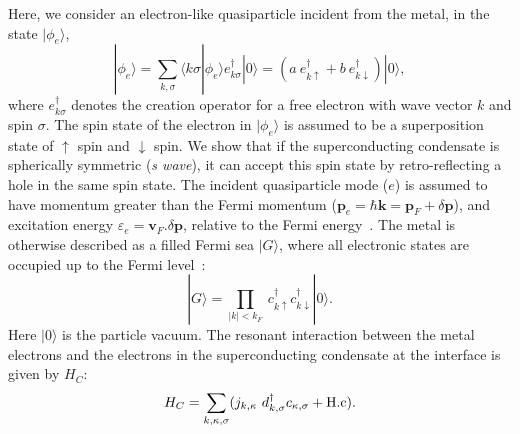 \documentclass[12pt,letterpaper,aps,onecolumn,superscriptaddress,floatfix,notitlepage]{revtex4-1}
\begin{document}
	Here, we consider an electron-like quasiparticle incident from the metal, in the state $|\phi_{e}\rangle$, 
	\begin{equation}|\phi_{e}\rangle =\sum\limits_{k,\sigma}\langle k\sigma|\phi_{e}\rangle e_{k\sigma}^{\dagger}|0\rangle =  (a~e^{\dagger}_{k\uparrow}+b~e^{\dagger}_{k\downarrow})|0\rangle,\end{equation} 
	where $e^{\dagger}_{k\sigma}$ denotes the creation operator for a free electron with wave vector $k$ and spin $\sigma$. The	spin state of the electron in $|\phi_{e}\rangle$ is assumed to be a superposition state of $\uparrow$ spin and $\downarrow$ spin.
	We show that if the superconducting condensate is spherically symmetric (\textit{s wave}), it can accept this spin state by retro-reflecting a hole in the same spin state. The incident quasiparticle mode ($e$) is assumed to have momentum greater than the Fermi momentum ($	\textbf{p}_{e} = \hbar \textbf{k} = \textbf{p}_{F}+\delta \textbf{p}$), and excitation energy $\varepsilon_{e} = \textbf{v}_{F}.\delta\textbf{p}$, relative to the Fermi energy~\cite{spintron}.
	The metal is otherwise described as a filled Fermi sea $|G\rangle$, where all electronic states are occupied up to the Fermi level~\cite{mahan}:
	\begin{equation}
	|G\rangle = \prod_{|k|<k_{F}}~c_{k\uparrow}^{\dagger}c_{k\downarrow}^{\dagger}|0\rangle.\end{equation}
	Here $|0\rangle$ is the particle vacuum.  The resonant interaction between the metal electrons and the electrons in the superconducting condensate at the interface is given by $H_{C}$:
	\begin{equation} 
	H_{C} = \sum\limits_{k,\kappa,\sigma}(j_{k,\kappa}~d_{k,\sigma}^{\dagger}c_{\kappa,\sigma}+\rm{H.c}).\end{equation} 
\end{document}

